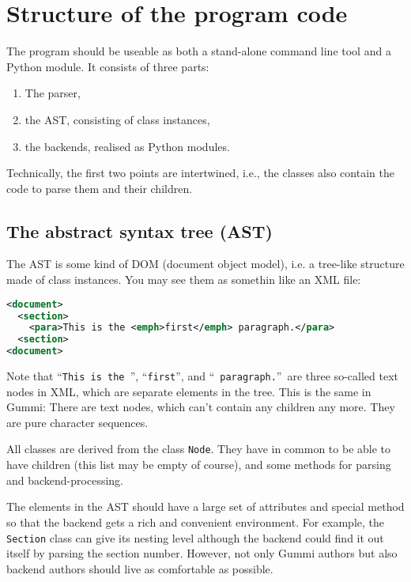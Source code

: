 \documentclass[12pt,openany]{book}
\begin{document}
\section{Structure of the program code}

The program should be useable as both a stand-alone command line tool and a
Python module.  It consists of three parts:

\begin{enumerate}
\item The parser,
\item the AST, consisting of class instances,
\item the backends, realised as Python modules.
\end{enumerate}

Technically, the first two points are intertwined, i.e., the classes also
contain the code to parse them and their children.

\subsection{The abstract syntax tree (AST)}

The AST is some kind of DOM (document object model), i.e. a tree-like structure
made of class instances.  You may see them as somethin like an XML file:

\begin{lstlisting}[language=XML]
<document>
  <section>
    <para>This is the <emph>first</emph> paragraph.</para>
  <section>
<document>
\end{lstlisting}

Note that ``\texttt{This is the~}'', ``\texttt{first}'', and
``~\texttt{paragraph.}''\ are three so-called text nodes in XML, which are
separate elements in the tree.  This is the same in Gummi: There are text
nodes, which can't contain any children any more.  They are pure character
sequences.

All classes are derived from the class \lstinline{Node}.  They have in common
to be able to have children (this list may be empty of course), and some
methods for parsing and backend-processing.

\bigskip
%
The elements in the AST should have a large set of attributes and special
method so that the backend gets a rich and convenient environment.  For
example, the \lstinline{Section} class can give its nesting level although the
backend could find it out itself by parsing the section number.  However, not
only Gummi authors but also backend authors should live as comfortable as
possible.
\end{document}
